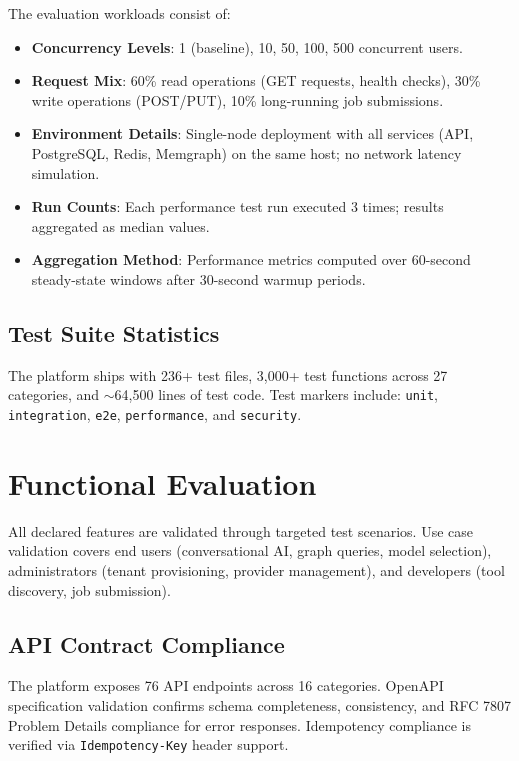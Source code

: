 \documentclass[a4paper,twoside]{sapthesis}
\newcommand{\EndpointCount}{76}
\begin{document}
The evaluation workloads consist of:

\begin{itemize}
    \item \textbf{Concurrency Levels}: 1 (baseline), 10, 50, 100, 500 concurrent users.
    \item \textbf{Request Mix}: 60\% read operations (GET requests, health checks), 30\% write operations (POST/PUT), 10\% long-running job submissions.
    \item \textbf{Environment Details}: Single-node deployment with all services (API, PostgreSQL, Redis, Memgraph) on the same host; no network latency simulation.
    \item \textbf{Run Counts}: Each performance test run executed 3 times; results aggregated as median values.
    \item \textbf{Aggregation Method}: Performance metrics computed over 60-second steady-state windows after 30-second warmup periods.
\end{itemize}

\subsection{Test Suite Statistics}

The platform ships with 236+ test files, 3,000+ test functions across 27 categories, and $\sim$64,500 lines of test code. Test markers include: \texttt{unit}, \texttt{integration}, \texttt{e2e}, \texttt{performance}, and \texttt{security}.

\section{Functional Evaluation}
\label{sec:functional-eval}

All declared features are validated through targeted test scenarios. Use case validation covers end users (conversational AI, graph queries, model selection), administrators (tenant provisioning, provider management), and developers (tool discovery, job submission).

\subsection{API Contract Compliance}

The platform exposes \EndpointCount{} API endpoints across 16 categories. OpenAPI specification validation confirms schema completeness, consistency, and RFC 7807 Problem Details compliance for error responses. Idempotency compliance is verified via \texttt{Idempotency-Key} header support.
\end{document}
